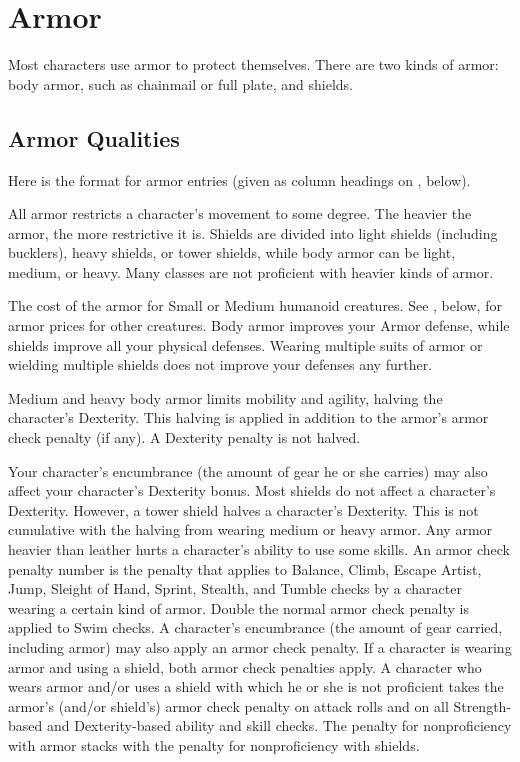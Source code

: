 \section{Armor}

Most characters use armor to protect themselves. There are two kinds of armor: body armor, such as chainmail or full plate, and shields.

\subsection{Armor Qualities}
\par Here is the format for armor entries (given as column headings on , below).

 All armor restricts a character's movement to some degree. The heavier the armor, the more restrictive it is. Shields are divided into light shields (including bucklers), heavy shields, or tower shields, while body armor can be light, medium, or heavy. Many classes are not proficient with heavier kinds of armor.

 The cost of the armor for Small or Medium humanoid
creatures. See , below, for armor prices for other creatures.
 Body armor improves your Armor defense, while shields improve all your physical defenses. Wearing multiple suits of armor or wielding multiple shields does not improve your defenses any further.

 Medium and heavy body armor limits mobility and agility, halving the character's Dexterity. This halving is applied in addition to the armor's armor check penalty (if any). A Dexterity penalty is not halved.

Your character's encumbrance (the amount of gear he or she carries) may also affect your character's Dexterity bonus.
 Most shields do not affect a character's Dexterity. However, a tower shield halves a character's Dexterity. This is not cumulative with the halving from wearing medium or heavy armor.
 Any armor heavier than leather hurts a character's ability to use some skills. An armor check penalty number is the penalty that applies to Balance, Climb, Escape Artist, Jump, Sleight of Hand, Sprint, Stealth, and Tumble checks by a character wearing a certain kind of armor. Double the normal armor check penalty is applied to Swim checks. A character's encumbrance (the amount of gear carried, including armor) may also apply an armor check penalty.
 If a character is wearing armor and using a shield, both armor check penalties apply.
 A character who wears armor and/or uses a shield with which he or she is not proficient takes the armor's (and/or shield's) armor check penalty on attack rolls and on all Strength-based and Dexterity-based ability and skill checks. The penalty for nonproficiency with armor stacks with the penalty for nonproficiency with shields.

